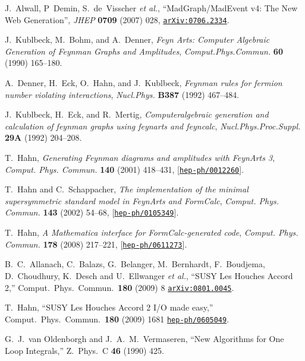 \documentclass[english,12pt]{article}
\begin{document}
\begin{thebibliography}{10}
J.~Alwall, P~Demin, S.~de~Visscher {\em et al.}, ``{MadGraph/MadEvent v4: The New Web Generation}'',
  {\em JHEP} {\bf 0709} (2007) 028,
\href{http://www.arXiv.org/abs/0706.2334}{{\tt arXiv:0706.2334}}.

J.~Kublbeck, M.~Bohm, and A.~Denner, {\it {Feyn Arts: Computer Algebraic Generation
  of Feynman Graphs and Amplitudes}},  {\em Comput.Phys.Commun.}
  {\bf 60} (1990) 165--180.

A.~Denner, H.~Eck, O.~Hahn, and J.~Kublbeck, {\it {Feynman rules for fermion
  number violating interactions}},  {\em Nucl.Phys.} {\bf B387} (1992)
  467--484.

J.~Kublbeck, H.~Eck, and R.~Mertig, {\it Computeralgebraic generation and
  calculation of feynman graphs using feynarts and feyncalc},  {\em
  Nucl.Phys.Proc.Suppl.} {\bf 29A} (1992) 204--208.

T.~Hahn, {\it {Generating Feynman diagrams and amplitudes with FeynArts 3}},
  {\em Comput. Phys. Commun.} {\bf 140} (2001) 418--431,
  [\href{http://www.arXiv.org/abs/hep-ph/0012260}{{\tt hep-ph/0012260}}].

T.~Hahn and C.~Schappacher, {\it {The implementation of the minimal
  supersymmetric standard model in FeynArts and FormCalc}},  {\em Comput. Phys.
  Commun.} {\bf 143} (2002) 54--68,
  [\href{http://www.arXiv.org/abs/hep-ph/0105349}{{\tt hep-ph/0105349}}].

T.~Hahn, {\it {A Mathematica interface for FormCalc-generated code}},  {\em
  Comput. Phys. Commun.} {\bf 178} (2008) 217--221,
  [\href{http://www.arXiv.org/abs/hep-ph/0611273}{{\tt hep-ph/0611273}}].

  B.~C.~Allanach, C.~Balazs, G.~Belanger, M.~Bernhardt, F.~Boudjema, D.~Choudhury, K.~Desch and U.~Ellwanger {\it et al.},
  ``SUSY Les Houches Accord 2,''
  Comput.\ Phys.\ Commun.\  {\bf 180} (2009) 8
  \href{http://arxiv.org/abs/0801.0045}{\tt arXiv:0801.0045}.

  T.~Hahn,
  ``SUSY Les Houches Accord 2 I/O made easy,''
  Comput.\ Phys.\ Commun.\  {\bf 180} (2009) 1681
  \href{http://arxiv.org/abs/hep-ph/0605049}{\tt hep-ph/0605049}.

  G.~J.~van Oldenborgh and J.~A.~M.~Vermaseren,
  ``New Algorithms for One Loop Integrals,''
  Z.\ Phys.\ C {\bf 46} (1990) 425.


\end{thebibliography}
\end{document}
